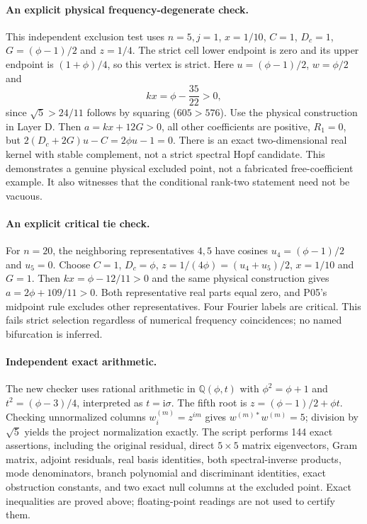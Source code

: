 \documentclass[11pt]{article}
\newcommand{\ii}{\mathrm i}
\begin{document}
\paragraph{An explicit physical frequency-degenerate check.}
This independent exclusion test uses $n=5,j=1$, $x=1/10$, $C=1$,
$D_c=1$, $G=(\phi-1)/2$ and $z=1/4$. The strict cell lower endpoint
is zero and its upper endpoint is $(1+\phi)/4$, so this vertex is strict.
Here $u=(\phi-1)/2$, $w=\phi/2$ and
\[
 kx=\phi-\frac{35}{22}>0,
\]
since $\sqrt5>24/11$ follows by squaring ($605>576$).
Use the physical construction in Layer D. Then $a=kx+12G>0$,
all other coefficients are positive, $R_1=0$, but
$2(D_c+2G)u-C=2\phi u-1=0$. There is an exact two-dimensional
real kernel with stable complement, not a strict spectral Hopf candidate.
This demonstrates a genuine physical excluded point, not a fabricated
free-coefficient example. It also witnesses that the conditional rank-two
statement need not be vacuous.

\paragraph{An explicit critical tie check.}
For $n=20$, the neighboring representatives $4,5$ have cosines
$u_4=(\phi-1)/2$ and $u_5=0$. Choose $C=1$, $D_c=\phi$,
$z=1/(4\phi)=(u_4+u_5)/2$, $x=1/10$ and $G=1$.
Then $kx=\phi-12/11>0$ and the same physical construction gives
$a=2\phi+109/11>0$. Both representative real parts equal zero,
and P05's midpoint rule excludes other representatives. Four Fourier
labels are critical. This fails strict selection regardless of numerical
frequency coincidences; no named bifurcation is inferred.

\paragraph{Independent exact arithmetic.}
The new checker uses rational arithmetic in
$\mathbb Q(\phi,t)$ with $\phi^2=\phi+1$ and
$t^2=(\phi-3)/4$, interpreted as $t=\ii\sigma$.
The fifth root is $z=(\phi-1)/2+\phi t$. Checking unnormalized
columns $w_i^{(m)}=z^{im}$ gives $w^{(m)*}w^{(m)}=5$;
division by $\sqrt5$ yields the project normalization exactly.
The script performs 144 exact assertions, including the original residual,
direct $5\times5$ matrix eigenvectors, Gram matrix, adjoint residuals,
real basis identities, both spectral-inverse products, mode denominators,
branch polynomial and discriminant identities, exact obstruction constants,
and two exact null columns at the excluded point. Exact inequalities are
proved above; floating-point readings are not used to certify them.
\end{document}
